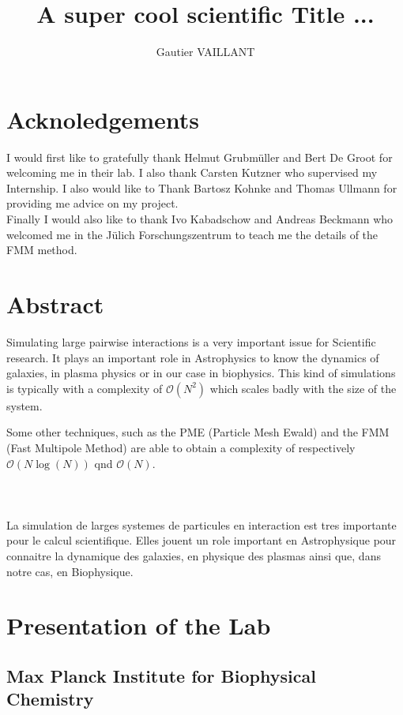 \documentclass[10pt,twoside,a4paper]{report}
\title{A super cool scientific Title ...}
\author{Gautier VAILLANT}
\begin{document}
\maketitle

\chapter*{Acknoledgements}

I would first like to gratefully thank Helmut Grubmüller and Bert De Groot for welcoming me in their lab. I also thank Carsten Kutzner who supervised my Internship. I also would like to Thank Bartosz Kohnke and Thomas Ullmann for providing me advice on my project.\\ 

Finally I would also like to thank Ivo Kabadschow and Andreas Beckmann who welcomed me in the Jülich Forschungszentrum to teach me the details of the FMM method. 


\chapter*{Abstract}

Simulating large pairwise interactions is a very important issue for Scientific research. It plays an important role in Astrophysics to know the dynamics of galaxies, in plasma physics or in our case in biophysics. This kind of simulations is typically with a complexity of $\mathcal{O}(N^2)$ which scales badly with the size of the system.

Some other techniques, such as the PME (Particle Mesh Ewald) and the FMM (Fast Multipole Method) are able to obtain a complexity of respectively $\mathcal{O}(N\log(N))$ qnd $\mathcal{O}(N)$.
\\
\\
\\
\\

La simulation de larges systemes de particules en interaction est tres importante pour le calcul scientifique. Elles jouent un role important en Astrophysique pour connaitre la dynamique des galaxies, en physique des plasmas ainsi que, dans notre cas, en Biophysique.


\tableofcontents

\chapter{Presentation of the Lab}
\section*{Max Planck Institute for Biophysical Chemistry}
\end{document}
